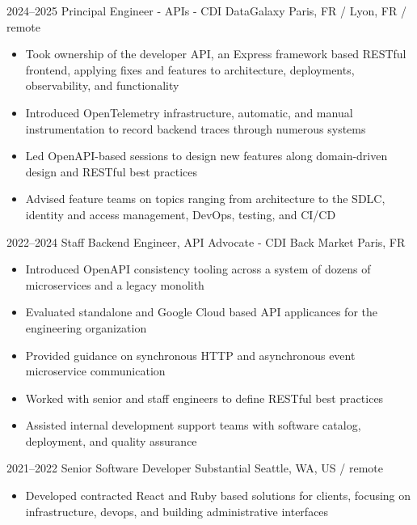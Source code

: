 \documentclass[11pt,a4paper,sans]{moderncv}
\begin{document}
  \cventry
    {2024--2025}
    {Principal Engineer - APIs - CDI}
    {DataGalaxy}
    {Paris, FR / Lyon, FR / remote}
    {}
    {
      \begin{itemize}
        \item Took ownership of the developer API, an Express framework based RESTful frontend, applying fixes and features to architecture, deployments, observability, and functionality
        \item Introduced OpenTelemetry infrastructure, automatic, and manual instrumentation to record backend traces through numerous systems
        \item Led OpenAPI-based sessions to design new features along domain-driven design and RESTful best practices
        \item Advised feature teams on topics ranging from architecture to the SDLC, identity and access management, DevOps, testing, and CI/CD
      \end{itemize}
    }

  \cventry
    {2022--2024}
    {Staff Backend Engineer, API Advocate - CDI}
    {Back Market}
    {Paris, FR}
    {}
    {
      \begin{itemize}
        \item Introduced OpenAPI consistency tooling across a system of dozens of microservices and a legacy monolith
        \item Evaluated standalone and Google Cloud based API applicances for the engineering organization
        \item Provided guidance on synchronous HTTP and asynchronous event microservice communication
        \item Worked with senior and staff engineers to define RESTful best practices
        \item Assisted internal development support teams with software catalog, deployment, and quality assurance
      \end{itemize}
    }

  \cventry
    {2021--2022}
    {Senior Software Developer}
    {Substantial}
    {Seattle, WA, US / remote}
    {}
    {
      \begin{itemize}
        \item Developed contracted React and Ruby based solutions for clients, focusing on infrastructure, devops, and building administrative interfaces
      \end{itemize}
    }
\end{document}
